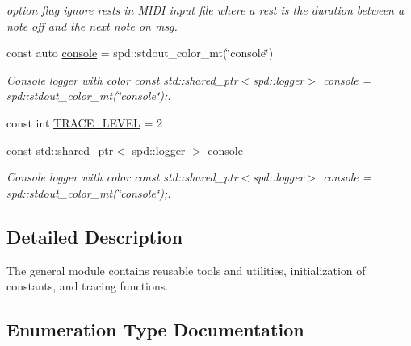 \begin{DoxyCompactItemize}
\begin{DoxyCompactList}\small\item\em option flag ignore rests in M\+I\+DI input file where a rest is the duration between a note off and the next note on msg. \end{DoxyCompactList}\item 
\mbox{\label{group__general_ga94c56112daf0fd5ccea22ff040dab387}} 
const auto \mbox{\hyperlink{group__general_ga94c56112daf0fd5ccea22ff040dab387}{console}} = spd\+::stdout\+\_\+color\+\_\+mt(\char`\"{}console\char`\"{})
\begin{DoxyCompactList}\small\item\em Console logger with color const std\+::shared\+\_\+ptr$<$spd\+::logger$>$ console = spd\+::stdout\+\_\+color\+\_\+mt(\char`\"{}console\char`\"{});. \end{DoxyCompactList}\item 
const int \mbox{\hyperlink{group__general_gac021c39dd4209cc19d4ec5049b3a94ec}{T\+R\+A\+C\+E\+\_\+\+L\+E\+V\+EL}} = 2
\item 
\mbox{\label{group__general_gad61df4571453c6f7c1c829265837e500}} 
const std\+::shared\+\_\+ptr$<$ spd\+::logger $>$ \mbox{\hyperlink{group__general_gad61df4571453c6f7c1c829265837e500}{console}}
\begin{DoxyCompactList}\small\item\em Console logger with color const std\+::shared\+\_\+ptr$<$spd\+::logger$>$ console = spd\+::stdout\+\_\+color\+\_\+mt(\char`\"{}console\char`\"{});. \end{DoxyCompactList}\end{DoxyCompactItemize}


\subsection{Detailed Description}
The {\ttfamily general} module contains reusable tools and utilities, initialization of constants, and tracing functions. 



\subsection{Enumeration Type Documentation}
\mbox{\label{group__general_gae07bdce6f4896785ead3b815ca6ab560}} 
